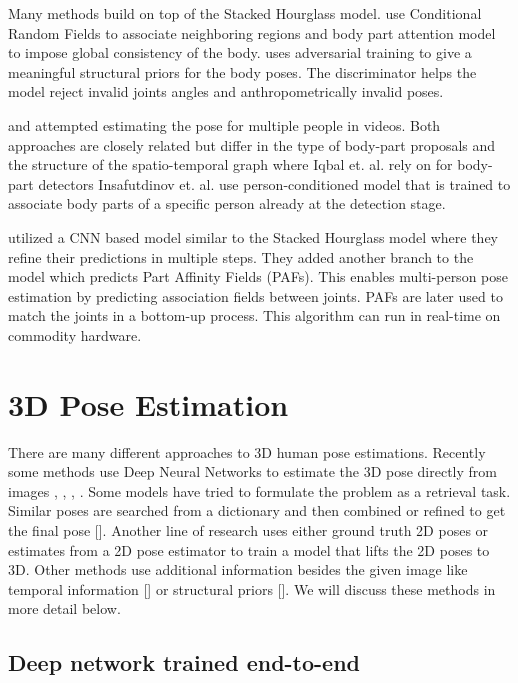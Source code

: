 Many methods build on top of the Stacked Hourglass model. \parencite{chu2017multi} use Conditional Random Fields to associate neighboring regions and body part attention model to impose global consistency of the body. \parencite{chou2017self} uses adversarial training to give a meaningful structural priors for the body poses. The discriminator helps the model reject invalid joints angles and anthropometrically invalid poses.

\parencite{iqbal2017posetrack} and \parencite{insafutdinov2017arttrack} attempted estimating the pose for multiple people in  videos. Both approaches are closely related but differ in the type of body-part proposals and the structure of the spatio-temporal graph where Iqbal et. al. rely on \parencite{insafutdinov2016deepercut} for body-part detectors Insafutdinov et. al. use person-conditioned model that is trained to associate body parts of a specific person already at the detection stage. 

\parencite{cao2016realtime} utilized a CNN based model similar to the Stacked Hourglass model where they refine their predictions in multiple steps. They added another branch to the model which predicts Part Affinity Fields (PAFs). This enables multi-person pose estimation by predicting association fields between joints. PAFs are later used to match the joints in a bottom-up process. This algorithm can run in real-time on commodity hardware.

\section{3D Pose Estimation}

There are many different approaches to 3D human pose estimations. Recently some methods use Deep Neural Networks to estimate the 3D pose directly from images \parencite{pavlakos2017coarse}, \parencite{tekin2016structured}, \parencite{varol2017learning}, \parencite{rogez2016mocap}. Some models have tried to formulate the problem as a retrieval task. Similar poses are searched from a dictionary and then combined or refined to get the final pose []. Another line of research uses either ground truth 2D poses or estimates from a 2D pose estimator to train a model that lifts the 2D poses to 3D. Other methods use additional information besides the given image like temporal information [] or structural priors []. We will discuss these methods in more detail below.

\subsection{Deep network trained end-to-end}

